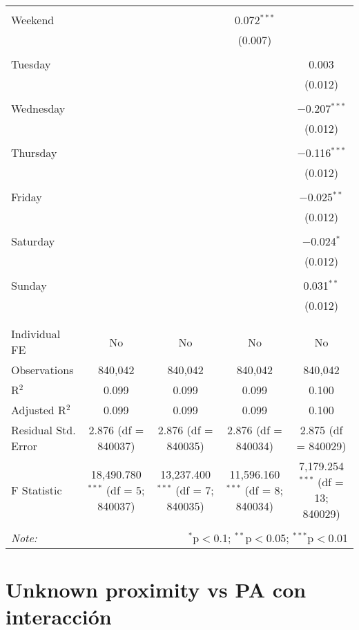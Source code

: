 \documentclass[
]{article}
\begin{document}
\begin{table}[!htbp]
{\begin{tabular}{@{\extracolsep{5pt}}lcccc}
  & & & & \\ 
 Weekend &  &  & 0.072$^{***}$ &  \\ 
  &  &  & (0.007) &  \\ 
  & & & & \\ 
 Tuesday &  &  &  & 0.003 \\ 
  &  &  &  & (0.012) \\ 
  & & & & \\ 
 Wednesday &  &  &  & $-$0.207$^{***}$ \\ 
  &  &  &  & (0.012) \\ 
  & & & & \\ 
 Thursday &  &  &  & $-$0.116$^{***}$ \\ 
  &  &  &  & (0.012) \\ 
  & & & & \\ 
 Friday &  &  &  & $-$0.025$^{**}$ \\ 
  &  &  &  & (0.012) \\ 
  & & & & \\ 
 Saturday &  &  &  & $-$0.024$^{*}$ \\ 
  &  &  &  & (0.012) \\ 
  & & & & \\ 
 Sunday &  &  &  & 0.031$^{**}$ \\ 
  &  &  &  & (0.012) \\ 
  & & & & \\ 
\hline \\[-1.8ex] 
Individual FE & No & No & No & No \\ 
Observations & 840,042 & 840,042 & 840,042 & 840,042 \\ 
R$^{2}$ & 0.099 & 0.099 & 0.099 & 0.100 \\ 
Adjusted R$^{2}$ & 0.099 & 0.099 & 0.099 & 0.100 \\ 
Residual Std. Error & 2.876 (df = 840037) & 2.876 (df = 840035) & 2.876 (df = 840034) & 2.875 (df = 840029) \\ 
F Statistic & 18,490.780$^{***}$ (df = 5; 840037) & 13,237.400$^{***}$ (df = 7; 840035) & 11,596.160$^{***}$ (df = 8; 840034) & 7,179.254$^{***}$ (df = 13; 840029) \\ 
\hline 
\hline \\[-1.8ex] 
\textit{Note:}  & \multicolumn{4}{r}{$^{*}$p$<$0.1; $^{**}$p$<$0.05; $^{***}$p$<$0.01} \\ 
\end{tabular}
} 
\end{table} 
\newpage
\section{Unknown proximity vs PA con interacción}
\end{document}
